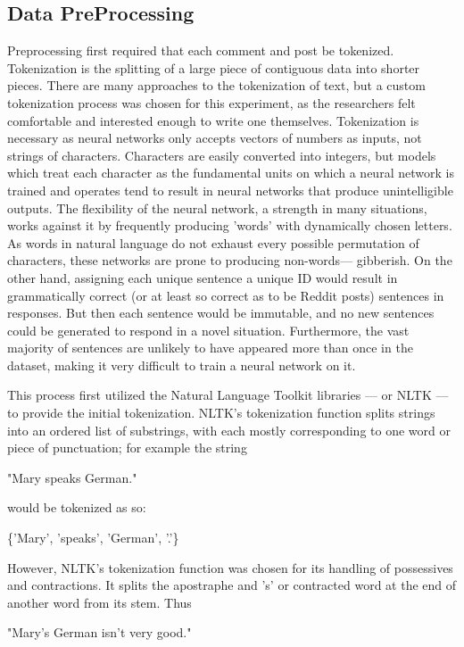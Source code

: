 \documentclass[11pt,twocolumn]{article}
\begin{document}
\subsection*{Data PreProcessing}
Preprocessing first required that each comment and post be tokenized. Tokenization is the splitting of a large piece of contiguous data into shorter pieces. There are many approaches to the tokenization of text, but a custom tokenization process was chosen for this experiment, as the researchers felt comfortable and interested enough to write one themselves. Tokenization is necessary as neural networks only accepts vectors of numbers as inputs, not strings of characters. Characters are easily converted into integers, but models which treat each character as the fundamental units on which a neural network is trained and operates tend to result in neural networks that produce unintelligible outputs. The flexibility of the neural network, a strength in many situations, works against it by frequently producing 'words' with dynamically chosen letters. As words in natural language do not exhaust every possible permutation of characters, these networks are prone to producing non-words— gibberish. On the other hand, assigning each unique sentence a unique ID would result in grammatically correct (or at least so correct as to be Reddit posts) sentences in responses. But then each sentence would be immutable, and no new sentences could be generated to respond in a novel situation. Furthermore, the vast majority of sentences are unlikely to have appeared more than once in the dataset, making it very difficult to train a neural network on it.
\par This process first utilized the Natural Language Toolkit libraries — or NLTK — to provide the initial tokenization. NLTK's tokenization function splits strings into an ordered list of substrings, with each mostly corresponding to one word or piece of punctuation; for example the string  
\begin{exe}
		\ex "Mary speaks German."
\end{exe}
would be tokenized as so:
\begin{exe}
		\ex \{'Mary', 'speaks', 'German', '.'\}
\end{exe}
However, NLTK's tokenization function was chosen for its handling of possessives and contractions. It splits the apostraphe and 's' or contracted word at the end of another word from its stem. Thus
\begin{exe}
		\ex "Mary's German isn't very good."
\end{exe}
\end{document}
